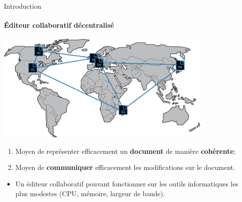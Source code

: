\begin{frame}{Introduction}\framesubtitle{Éditeur collaboratif décentralisé}
  
  \begin{center}
    \includegraphics[width=0.8\textwidth]{img/world.png}
  \end{center}

  \vspace{0.75cm}
  
  \begin{enumerate}
    \item Moyen de représenter efficacement un \textbf{document} de manière
      \textbf{cohérente};
    \item Moyen de \textbf{communiquer} efficacement les modifications sur le
      document.
  \end{enumerate}

  \begin{itemize}
  \item Un éditeur collaboratif pouvant fonctionner sur les outils informatiques
    les plus modestes (CPU, mémoire, largeur de bande).
  \end{itemize}

\end{frame}


